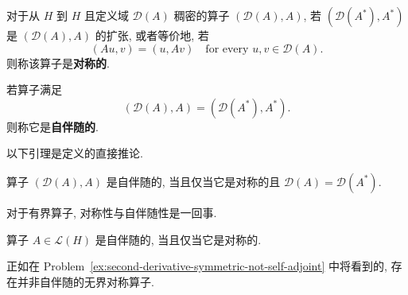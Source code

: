 \begin{Definition}
\label{def:symmetric-operator}
对于从 $H$ 到 $H$ 且定义域 $\mathcal{D}(A)$ 稠密的算子 $(\mathcal{D}(A),A)$, 若 $(\mathcal{D}(A^*),A^*)$ 是 $(\mathcal{D}(A),A)$ 的扩张, 或者等价地, 若
\begin{equation}\label{eq:symmetric-operator-pairing-identity}
(Au,v)=(u,Av)\quad\text{for every }u,v\in\mathcal{D}(A).
\end{equation}
则称该算子是\textbf{对称的}.
\end{Definition}

\begin{Definition}
\label{def:self-adjoint-operator}
若算子满足
\begin{equation}\label{eq:self-adjoint-operator-domain-action-equality}
(\mathcal{D}(A),A)=(\mathcal{D}(A^*),A^*).
\end{equation}
则称它是\textbf{自伴随的}.
\end{Definition}

以下引理是定义的直接推论.

\begin{Lemma}
\label{lem:self-adjoint-symmetric-domain-equality}
算子 $(\mathcal{D}(A),A)$ 是自伴随的, 当且仅当它是对称的且 $\mathcal{D}(A)=\mathcal{D}(A^*)$.
\end{Lemma}

对于有界算子, 对称性与自伴随性是一回事.

\begin{Theorem}
\label{thm:bounded-symmetric-operator-self-adjoint}
算子 $A\in\mathcal{L}(H)$ 是自伴随的, 当且仅当它是对称的.
\end{Theorem}

\begingroup
{}
\renewcommand{\endProof}{\par\nobreak\hfill$\blacksquare$\par\vspace{0.1cm}}
\endgroup

正如在 Problem~\ref{ex:second-derivative-symmetric-not-self-adjoint} 中将看到的, 存在并非自伴随的无界对称算子.

